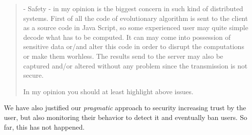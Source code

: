 \documentclass[preprint]{elsarticle}
\begin{document}
\begin{quote} 

 - Safety - in my opinion is the biggest concern in such kind of distributed systems. First of all the
 code of evolutionary algorithm is sent to the client as a source code in Java Script, so some
 experienced user may quite simple decode what has to be computed. It can may come into
 possession of sensitive data or/and alter this code in order to disrupt the computations or make
 them worhless. The results send to the server may also be captured and/or altered without any
 problem since the transmission is not secure.

 In my opinion you should at least highlight above issues.
\end{quote}

We have also justified our {\em pragmatic} approach to security
increasing trust by the user, but also monitoring their behavior to
detect it and eventually ban users. So far, this has not happened. 
\end{document}
